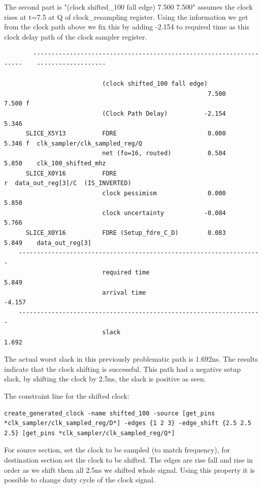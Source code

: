 \documentclass{report}
\begin{document}
The second part is "(clock shifted\_100 fall edge) 7.500 7.500" assumes the clock rises at t=7.5 at Q of clock\_resampling register. Using the information we get from the clock path above we fix this by adding -2.154 to required time as this clock delay path of the clock sampler register. 
\begin{verbatim}
        -------------------------------------------------------------------    -------------------
  
                           (clock shifted_100 fall edge)
                                                        7.500     7.500 f  
                           (Clock Path Delay)          -2.154     5.346
      SLICE_X5Y13          FDRE                         0.000     5.346 f  clk_sampler/clk_sampled_reg/Q
                           net (fo=16, routed)          0.504     5.850    clk_100_shifted_mhz
      SLICE_X0Y16          FDRE                                         r  data_out_reg[3]/C  (IS_INVERTED)
                           clock pessimism              0.000     5.850    
                           clock uncertainty           -0.084     5.766    
      SLICE_X0Y16          FDRE (Setup_fdre_C_D)        0.083     5.849    data_out_reg[3]
    -------------------------------------------------------------------
                           required time                          5.849    
                           arrival time                          -4.157    
    -------------------------------------------------------------------
                           slack                                  1.692    
\end{verbatim}
The actual worst slack in this previously problematic path is 1.692ns. The results indicate that the clock shifting is successful. This path had a negative setup slack, by shifting the clock by 2.5ns, the slack is positive as seen.

The constraint line for the shifted clock:
\begin{verbatim}
create_generated_clock -name shifted_100 -source [get_pins *clk_sampler/clk_sampled_reg/D*] -edges {1 2 3} -edge_shift {2.5 2.5 2.5} [get_pins *clk_sampler/clk_sampled_reg/Q*]
\end{verbatim}
For source section, set the clock to be sampled (to match frequency), for destination section set the clock to be shifted. The edges are rise fall and rise in order as we shift them all 2.5ns we shifted whole signal. Using this property it is possible to change duty cycle of the clock signal.
\end{document}
